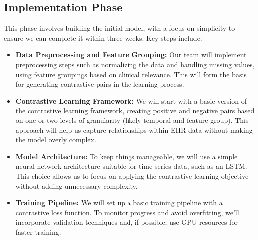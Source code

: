\documentclass[a4paper]{article}
\begin{document}
\subsection{Implementation Phase}
This phase involves building the initial model, with a focus on simplicity to ensure we can complete it within three weeks. Key steps include:
\begin{itemize}
    \item \textbf{Data Preprocessing and Feature Grouping:} Our team will implement preprocessing steps such as normalizing the data and handling missing values, using feature groupings based on clinical relevance. This will form the basis for generating contrastive pairs in the learning process.
    
    \item \textbf{Contrastive Learning Framework:} We will start with a basic version of the contrastive learning framework, creating positive and negative pairs based on one or two levels of granularity (likely temporal and feature group). This approach will help us capture relationships within EHR data without making the model overly complex.
    
    \item \textbf{Model Architecture:} To keep things manageable, we will use a simple neural network architecture suitable for time-series data, such as an LSTM. This choice allows us to focus on applying the contrastive learning objective without adding unnecessary complexity.
    
    \item \textbf{Training Pipeline:} We will set up a basic training pipeline with a contrastive loss function. To monitor progress and avoid overfitting, we’ll incorporate validation techniques and, if possible, use GPU resources for faster training.
\end{itemize}
\end{document}
